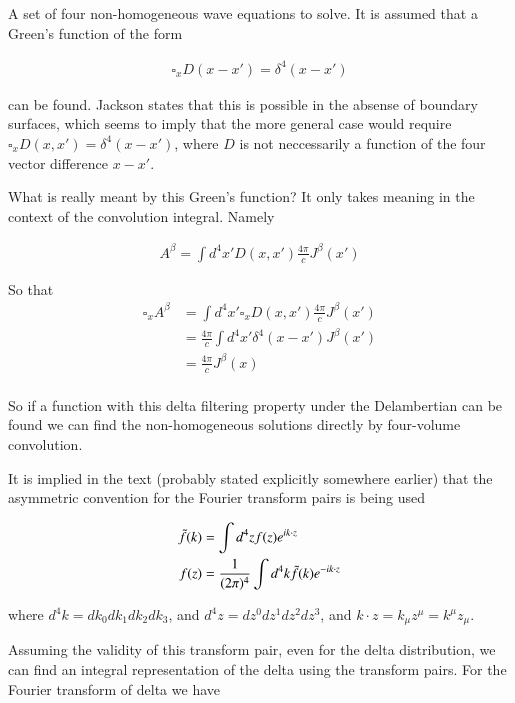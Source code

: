 A set of four non-homogeneous wave equations to solve.  It is assumed that a Green's function of the form

\begin{align}\label{eqn:jacksonRet:boo4}
\square_x D(x - x') = \delta^4(x - x')
\end{align}

can be found.  Jackson states that this is possible in the absense of boundary surfaces, which seems to imply that the more general case would require $\square_x D(x, x') = \delta^4(x - x')$, where $D$ is not neccessarily a function of the four vector difference $x - x'$.

What is really meant by this Green's function?  It only takes meaning in the context of the convolution integral.  Namely

\begin{align}\label{eqn:jacksonRet:boo5}
A^\beta = \int d^4 x' D(x, x') \frac{4 \pi}{c} J^\beta(x') 
\end{align}

So that
\begin{align*}
\square_x A^\beta 
&= \int d^4 x' \square_x D(x, x') \frac{4 \pi}{c} J^\beta(x') \\
&= \frac{4 \pi}{c} \int d^4 x' \delta^4(x - x') J^\beta(x') \\
&= \frac{4 \pi}{c} J^\beta(x) \\
\end{align*}

So if a function with this delta filtering property under the Delambertian can be found we can find the non-homogeneous solutions directly by four-volume convolution.

It is implied in the text (probably stated explicitly somewhere earlier) that the asymmetric convention for the Fourier transform pairs is being used

\begin{align}\label{eqn:jacksonRet:boo6}
\tilde{f}(k) &= \int d^4 z f(z) e^{i k \cdot z} \\
f(z) &= \frac{1}{(2\pi)^4} \int d^4 k \tilde{f}(k) e^{-i k \cdot z} 
\end{align}

where $d^4 k = dk_0 dk_1 dk_2 dk_3$, and $d^4 z = dz^0 dz^1 dz^2 dz^3$, and $k \cdot z = k_\mu z^\mu = k^\mu z_\mu$.

Assuming the validity of this transform pair, even for the delta distribution, we can find an integral representation of the delta using the transform pairs.  For the Fourier transform of delta we have

